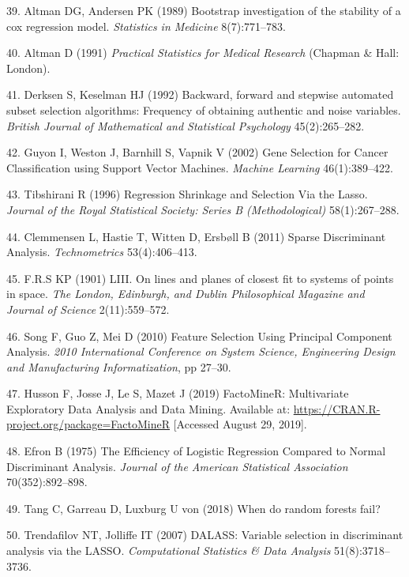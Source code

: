 \documentclass[12pt,]{article}
\begin{document}
\hypertarget{ref-altman_bootstrap_1989}{}
39. Altman DG, Andersen PK (1989) Bootstrap investigation of the
stability of a cox regression model. \emph{Statistics in Medicine}
8(7):771--783.

\hypertarget{ref-altman_practical_1991}{}
40. Altman D (1991) \emph{Practical Statistics for Medical Research}
(Chapman \& Hall: London).

\hypertarget{ref-derksen_backward_1992}{}
41. Derksen S, Keselman HJ (1992) Backward, forward and stepwise
automated subset selection algorithms: Frequency of obtaining authentic
and noise variables. \emph{British Journal of Mathematical and
Statistical Psychology} 45(2):265--282.

\hypertarget{ref-guyon_gene_2002}{}
42. Guyon I, Weston J, Barnhill S, Vapnik V (2002) Gene Selection for
Cancer Classification using Support Vector Machines. \emph{Machine
Learning} 46(1):389--422.

\hypertarget{ref-tibshirani_regression_1996}{}
43. Tibshirani R (1996) Regression Shrinkage and Selection Via the
Lasso. \emph{Journal of the Royal Statistical Society: Series B
(Methodological)} 58(1):267--288.

\hypertarget{ref-clemmensen_sparse_2011}{}
44. Clemmensen L, Hastie T, Witten D, Ersbøll B (2011) Sparse
Discriminant Analysis. \emph{Technometrics} 53(4):406--413.

\hypertarget{ref-f.r.s_liii._1901}{}
45. F.R.S KP (1901) LIII. On lines and planes of closest fit to systems
of points in space. \emph{The London, Edinburgh, and Dublin
Philosophical Magazine and Journal of Science} 2(11):559--572.

\hypertarget{ref-song_feature_2010}{}
46. Song F, Guo Z, Mei D (2010) Feature Selection Using Principal
Component Analysis. \emph{2010 International Conference on System
Science, Engineering Design and Manufacturing Informatization}, pp
27--30.

\hypertarget{ref-husson_factominer:_2019}{}
47. Husson F, Josse J, Le S, Mazet J (2019) FactoMineR: Multivariate
Exploratory Data Analysis and Data Mining. Available at:
\url{https://CRAN.R-project.org/package=FactoMineR} {[}Accessed August
29, 2019{]}.

\hypertarget{ref-efron_efficiency_1975}{}
48. Efron B (1975) The Efficiency of Logistic Regression Compared to
Normal Discriminant Analysis. \emph{Journal of the American Statistical
Association} 70(352):892--898.

\hypertarget{ref-tang_when_2018}{}
49. Tang C, Garreau D, Luxburg U von (2018) When do random forests fail?

\hypertarget{ref-trendafilov_dalass:_2007}{}
50. Trendafilov NT, Jolliffe IT (2007) DALASS: Variable selection in
discriminant analysis via the LASSO. \emph{Computational Statistics \&
Data Analysis} 51(8):3718--3736.
\end{document}
